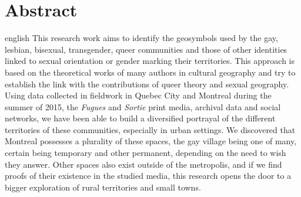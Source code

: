 \chapter*{Abstract}                      %

\begin{otherlanguage*}{english}
  This research work aims to identify the geosymbols used by the gay, lesbian, bisexual, transgender, queer communities and those of other identities linked to sexual orientation or gender marking their territories.
  This approach is based on the theoretical works of many authors in cultural geography and try to establish the link with the contributions of queer theory and sexual geography.
  Using data collected in fieldwork in Quebec City and Montreal during the summer of 2015, the \emph{Fugues} and \emph{Sortie} print media, archival data and social networks, we have been able to build a diversified portrayal of the different territories of these communities, especially in urban settings.
  We discovered that Montreal possesses a plurality of these spaces, the gay village being one of many, certain being temporary and other permanent, depending on the need to wish they answer.
  Other spaces also exist outside of the metropolis, and if we find proofs of their existence in the studied media, this research opens the door to a bigger exploration of rural territories and small towns.
\end{otherlanguage*}
